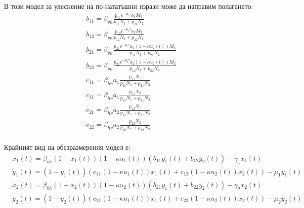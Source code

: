 В този модел за улеснение на по-нататъшни изрази може да направим полагането:
\begin{equation}
  \begin{split}
    &b_{11} = \beta_{vh} \frac{p_{11} e^{-\mu_1 \tau} a_1 M_1}{p_{11} N_1 + p_{21} N_2} \\
    &b_{12} = \beta_{vh} \frac{p_{12} e^{-\mu_2 \tau} a_2 M_2}{p_{12} N_1 + p_{22} N_2} \\
    &b_{21} = \beta_{vh} \frac{p_{21} e^{-\mu_1 \tau} a_1 (1-\kappa u_2(t)) M_1}{p_{11} N_1 + p_{21} N_2} \\
    &b_{22} = \beta_{vh} \frac{p_{22} e^{-\mu_2 \tau} a_2 (1-\kappa u_2(t)) M_2}{p_{12} N_1 + p_{22} N_2} \\
    &c_{11} = \beta_{hv} a_1 \frac{p_{11} N_1}{p_{11} N_1 + p_{21} N_2} \\
    &c_{11} = \beta_{hv} a_1 \frac{p_{21} N_2}{p_{11} N_1 + p_{21} N_2} \\
    &c_{21} = \beta_{hv} a_2 \frac{p_{12} N_1}{p_{11} N_1 + p_{21} N_2} \\
    &c_{22} = \beta_{hv} a_2 \frac{p_{22} N_2}{p_{12} N_1 + p_{22} N_2} \\
  \end{split}
\end{equation}

Крайният вид на обезразмерения модел е:
\begin{equation}
  \label{eq:TheDimensionlessProblem}
  \begin{split}
    &\dot{x}_1(t) = \beta_{vh} (1-x_1(t)) (1-\kappa u_1(t)) \left(b_{11} y_1(t) + b_{12} y_2(t)\right) - \gamma_1 x_1(t) \\
    &\dot{y}_1(t) = (1-y_1(t)) \left(c_{11}(1-\kappa u_1(t)) x_1(t) + c_{12}(1-\kappa u_2(t)) x_2(t)\right) - \mu_1 y_1(t) \\
    &\dot{x}_2(t) = \beta_{vh} (1-x_2(t)) (1-\kappa u_2(t))\left(b_{21} y_1(t) + b_{22} y_2(t)\right) - \gamma_2 x_2(t) \\
    &\dot{y}_2(t) = (1-y_2(t)) \left(c_{21}(1-\kappa u_1(t)) x_1(t) + c_{22} (1-\kappa u_2(t)) x_2(t)\right) - \mu_2 y_2(t)
  \end{split}
\end{equation}

